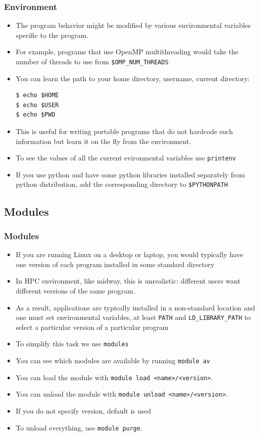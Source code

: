 \documentclass{beamer}
\begin{document}
\begin{frame}[fragile]
  \frametitle{Environment}
\begin{itemize}
\item The program behavior might be modified by various environmental variables specific to the program.
\item For example, programs that use OpenMP multithreading would take the number of threads to use from {\color{mycolorcli}\verb|$OMP_NUM_THREADS|}
\item You can learn the path to your home directory, username, current directory:
{\color{mycolorcli}
\begin{verbatim}
$ echo $HOME
$ echo $USER
$ echo $PWD
\end{verbatim}
}
\item This is useful for writing portable programs that do not hardcode such information but learn it on the fly from the environment. 
\item To see the values of all the current evironmental variables use {\color{mycolorcli}\verb|printenv|}
\item If you use python and have some python libraries installed separately from python distribution, add the corresponding directory to {\color{mycolorcli}\verb|$PYTHONPATH|}
\end{itemize}
\end{frame}

\subsection{Modules}
\begin{frame}[fragile]
  \frametitle{Modules}
\begin{itemize}
\item If you are running Linux on a desktop or laptop, you would typically have one version of each program installed in 
  some standard directory
\item In HPC environment, like midway, this is unrealistic: different users want different versions of the same program.
\item As a result, applications are typically installed in a non-standard location and one must set environmental variables, at least {\color{mycolorcli}\verb|PATH|} and  {\color{mycolorcli}\verb|LD_LIBRARY_PATH|} to select a particular version of a particular program
\item To simplify this task we use  {\color{mycolordef}\verb|modules|}
\item You can see which modules are available by running {\color{mycolorcli}\verb|module av|}
\item You can load the module with  {\color{mycolorcli}\verb|module load <name>/<version>|}. 
\item You can unload the module with  {\color{mycolorcli}\verb|module unload <name>/<version>|}. 
\item If you do not specify version, default is used
\item To unload everything, use {\color{mycolorcli}\verb|module purge|}.
\end{itemize}
\end{frame}
\end{document}
